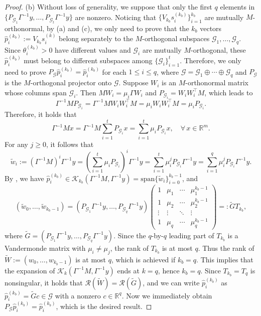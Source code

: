 \documentclass[10pt,a4paper]{amsart}
\newcommand\calG{\mathcal{G}}
\newcommand\calR{\mathcal{R}}
\begin{document}
\begin{proof}
  (b) Without loss of generality, we suppose that only the first $q$ elements in $\{P_{\mathcal{G}_1}\Gamma^{-1}y,\dots,P_{\mathcal{G}_t}\Gamma^{-1}y\}$ are nonzero. Noticing that $\{V_{k_b}s_{i}^{(k_b)}\}_{i=1}^{k_b}$ are mutually $M$-orthonormal, by  (a) and (c), we only need to prove that the $k_b$ vectors $\hat{p}_{i}^{(k_b)}:=V_{k_b}s_{i}^{(k)}$ belong separately to the $M$-orthogonal subspaces $\mathcal{G}_{1},\dots,\mathcal{G}_q$. Since $\theta_{i}^{(k_b)}>0$ have different values and $\calG_i$ are mutually $M$-orthogonal, these $\hat{p}_{i}^{(k_b)}$ must belong to different subspaces among $\{\mathcal{G}_i\}_{i=1}^{t}$. Therefore, we only need to prove $P_{\calG}\hat{p}_{i}^{(k_b)}=\hat{p}_{i}^{(k_b)}$ for each $1\leq i\leq q$, where $\calG=\calG_1\oplus\cdots\oplus\calG_q$ and $P_{\calG}$ is the $M$-orthogonal projector onto $\calG$. Suppose $W_i$ is an $M$-orthonormal matrix whose columns span $\mathcal{G}_i$. Then $MW_i=\mu_{i}\Gamma W_i$ and $P_{\mathcal{G}_i}=W_{i}W_{i}^{\top}M$, which leads to 
  \[\Gamma^{-1}MP_{\mathcal{G}_i}=\Gamma^{-1}MW_{i}W_{i}^{\top}M=\mu_i W_{i}W_{i}^{\top}M=\mu_iP_{\mathcal{G}_i}.\] 
  Therefore, it holds that 
  \[\Gamma^{-1}Mx 
    = \Gamma^{-1}M\sum_{i=1}^{t}P_{\mathcal{G}_i}x
    = \sum_{i=1}^{t}\mu_{i}P_{\mathcal{G}_i}x, \quad  \forall \, x\in\mathbb{R}^{m} .\]
  For any $j\geq 0$, it follows that 
  \begin{equation*}
    \widetilde{w}_i:=(\Gamma^{-1}M)^{i}\Gamma^{-1}y = \left(\sum_{i=1}^{t}\mu_{i}P_{\mathcal{G}_i} \right)^i \Gamma^{-1}y
    = \sum_{i=1}^{t}\mu_{i}^{j}P_{\mathcal{G}_i}\Gamma^{-1}y
    = \sum_{i=1}^{q}\mu_{i}^{j}P_{\mathcal{G}_i}\Gamma^{-1}y .
  \end{equation*}
  By , we have $\hat{p}_{i}^{(k_b)}\in\mathcal{K}_{k_b}(\Gamma^{-1}M,\Gamma^{-1}y)=\mathrm{span}\{\widetilde{w}_i\}_{i=0}^{k_b-1}$, and
	\begin{equation*}
		(\widetilde{w}_{0},\dots,\widetilde{w}_{k_b-1}) = (P_{\mathcal{G}_1}\Gamma^{-1}y, \dots, P_{\mathcal{G}_q}\Gamma^{-1}y)
		\begin{pmatrix}
			1 & \mu_{1} & \cdots & \mu_{1}^{k_b-1} \\
			1 & \mu_{2} & \cdots & \mu_{2}^{k_b-1} \\
			\vdots & \vdots & \ddots & \vdots \\
			1 & \mu_{q} & \cdots & \mu_{q}^{k_b-1}
			\end{pmatrix} =: \widetilde{G}T_{k_b},
	\end{equation*} 
	where $\widetilde{G}=(P_{\mathcal{G}_1}\Gamma^{-1}y, \dots, P_{\mathcal{G}_q}\Gamma^{-1}y)$. Since the $q$-by-$q$ leading part of $T_{k_b}$ is a Vandermonde matrix with $\mu_i\neq\mu_j$, the rank of $T_{k_b}$ is at most $q$. Thus the rank of $\widetilde{W}:=(w_{0},\dots,w_{k_b-1})$ is at most $q$, which is achieved if $k_b=q$. This implies that the expansion of $\mathcal K_{k}(\Gamma^{-1}M,\Gamma^{-1}y)$ ends at $k=q$, hence $k_b =q$. Since $T_{k_b}=T_{q}$ is nonsingular, it holds that $\calR(\widetilde{W})=\calR(\widetilde{G})$, and we can write $\hat{p}_{i}^{(k_b)}$ as $\hat{p}_{i}^{(k_b)}=\widetilde{G}c\in\calG$ with a nonzero $c\in\mathbb{R}^{q}$. Now we immediately obtain $P_{\calG}\hat{p}_{i}^{(k_b)}=\hat{p}_{i}^{(k_b)}$, which is the desired result.
\end{proof}
\end{document}

